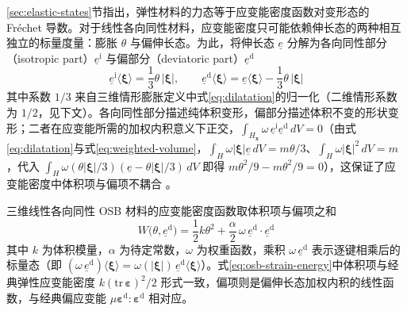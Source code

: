 \ref{sec:elastic-states}节指出，弹性材料的力态等于应变能密度函数对变形态的 Fréchet 导数。对于线性各向同性材料，应变能密度只可能依赖伸长态的两种相互独立的标量度量：膨胀 $\theta$ 与偏伸长态。为此，将伸长态 $\underline{e}$ 分解为各向同性部分（isotropic part）$\underline{e}^{\mathrm{i}}$ 与偏部分（deviatoric part）$\underline{e}^{\mathrm{d}}$
\begin{equation}
  \underline{e}^{\mathrm{i}}\langle\boldsymbol{\xi}\rangle=\frac{1}{3}\theta\,|\boldsymbol{\xi}|,\qquad
  \underline{e}^{\mathrm{d}}\langle\boldsymbol{\xi}\rangle=\underline{e}\langle\boldsymbol{\xi}\rangle-\frac{1}{3}\theta\,|\boldsymbol{\xi}|
  \label{eq:deviatoric-extension}
\end{equation}
其中系数 $1/3$ 来自三维情形膨胀定义中式\eqref{eq:dilatation}的归一化（二维情形系数为 $1/2$，见下文）。各向同性部分描述纯体积变形，偏部分描述体积不变的形状变形；二者在应变能所需的加权内积意义下正交，$\int_{H_{\mathbf{x}}}\omega\,\underline{e}^{\mathrm{i}}\underline{e}^{\mathrm{d}}\,dV=0$（由式\eqref{eq:dilatation}与式\eqref{eq:weighted-volume}，$\int_{H}\omega|\boldsymbol{\xi}|\underline{e}\,dV=m\theta/3$、$\int_{H}\omega|\boldsymbol{\xi}|^{2}\,dV=m$，代入 $\int_{H}\omega(\theta|\boldsymbol{\xi}|/3)(\underline{e}-\theta|\boldsymbol{\xi}|/3)\,dV$ 即得 $m\theta^{2}/9-m\theta^{2}/9=0$），这保证了应变能密度中体积项与偏项不耦合 \cite{Silling2007}。

三维线性各向同性 OSB 材料的应变能密度函数取体积项与偏项之和
\begin{equation}
  W\bigl(\theta,\underline{e}^{\mathrm{d}}\bigr)=\frac{1}{2}k\theta^{2}+\frac{\alpha}{2}\,\omega\,\underline{e}^{\mathrm{d}}\cdot\underline{e}^{\mathrm{d}}
  \label{eq:osb-strain-energy}
\end{equation}
其中 $k$ 为体积模量，$\alpha$ 为待定常数，$\omega$ 为权重函数，乘积 $\omega\,\underline{e}^{\mathrm{d}}$ 表示逐键相乘后的标量态（即 $(\omega\,\underline{e}^{\mathrm{d}})\langle\boldsymbol{\xi}\rangle=\omega(|\boldsymbol{\xi}|)\,\underline{e}^{\mathrm{d}}\langle\boldsymbol{\xi}\rangle$）。式\eqref{eq:osb-strain-energy}中体积项与经典弹性应变能密度 $k(\mathrm{tr}\,\boldsymbol{\varepsilon})^{2}/2$ 形式一致，偏项则是偏伸长态加权内积的线性函数，与经典偏应变能 $\mu\boldsymbol{\varepsilon}^{\mathrm{d}}:\boldsymbol{\varepsilon}^{\mathrm{d}}$ 相对应。

